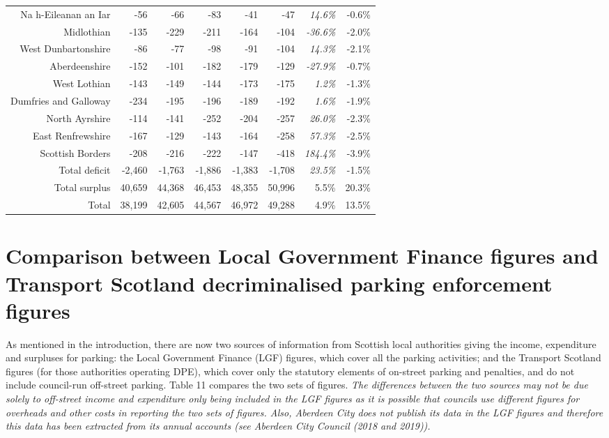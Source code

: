 \documentclass[
  12pt,
]{article}
\begin{document}
\begin{longtable}[t]{rrrrrrrr}
Na h-Eileanan an Iar & -56 & -66 & -83 & -41 & -47 & \em{ 14.6\%} & -0.6\%\\
Midlothian & -135 & -229 & -211 & -164 & -104 & \em{-36.6\%} & -2.0\%\\
West Dunbartonshire & -86 & -77 & -98 & -91 & -104 & \em{ 14.3\%} & -2.1\%\\
Aberdeenshire & -152 & -101 & -182 & -179 & -129 & \em{-27.9\%} & -0.7\%\\
West Lothian & -143 & -149 & -144 & -173 & -175 & \em{  1.2\%} & -1.3\%\\
Dumfries and Galloway & -234 & -195 & -196 & -189 & -192 & \em{  1.6\%} & -1.9\%\\
North Ayrshire & -114 & -141 & -252 & -204 & -257 & \em{ 26.0\%} & -2.3\%\\
East Renfrewshire & -167 & -129 & -143 & -164 & -258 & \em{ 57.3\%} & -2.5\%\\
Scottish Borders & -208 & -216 & -222 & -147 & -418 & \em{184.4\%} & -3.9\%\\
\midrule
Total deficit & -2,460 & -1,763 & -1,886 & -1,383 & -1,708 & \em{ 23.5\%} & -1.5\%\\
Total surplus & 40,659 & 44,368 & 46,453 & 48,355 & 50,996 & 5.5\% & 20.3\%\\
\midrule
Total & 38,199 & 42,605 & 44,567 & 46,972 & 49,288 & 4.9\% & 13.5\%\\*
\end{longtable}
\endgroup{}

\newpage

\hypertarget{comparison-between-local-government-finance-figures-and-transport-scotland-decriminalised-parking-enforcement-figures}{%
\section{Comparison between Local Government Finance figures and Transport Scotland decriminalised parking enforcement figures}\label{comparison-between-local-government-finance-figures-and-transport-scotland-decriminalised-parking-enforcement-figures}}

As mentioned in the introduction, there are now two sources of information from Scottish local authorities giving the income, expenditure and surpluses for parking: the Local Government Finance (LGF) figures, which cover all the parking activities; and the Transport Scotland figures (for those authorities operating DPE), which cover only the statutory elements of on-street parking and penalties, and do not include council-run off-street parking. Table 11 compares the two sets of figures. \emph{The differences between the two sources may not be due solely to off-street income and expenditure only being included in the LGF figures as it is possible that councils use different figures for overheads and other costs in reporting the two sets of figures. Also, Aberdeen City does not publish its data in the LGF figures and therefore this data has been extracted from its annual accounts (see Aberdeen City Council (2018 and 2019)).}
\end{document}
